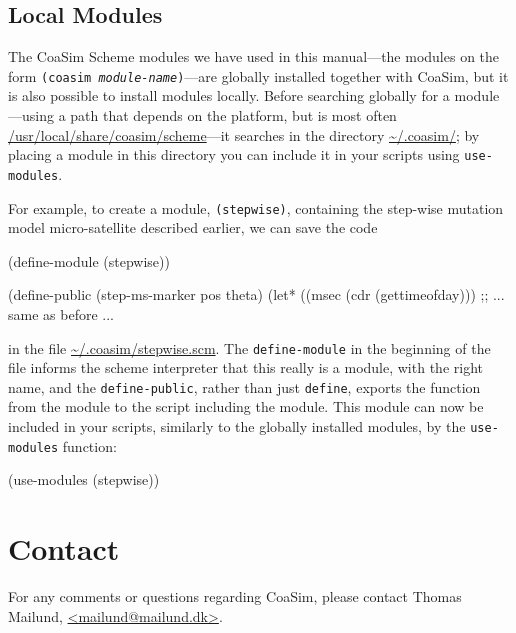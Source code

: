 \documentclass{manual}
\begin{document}
\subsection{Local Modules}
\label{sec:local-modules}

The CoaSim Scheme modules we have used in this manual---the modules on
the form \texttt{(coasim \emph{module-name})}---are globally installed
together with CoaSim, but it is also possible to install modules
locally.  Before searching globally for a module---using a path that
depends on the platform, but is most often
\url{/usr/local/share/coasim/scheme}---it searches in the directory
\url{~/.coasim/}; by placing a module in this directory you can
include it in your scripts using \texttt{use-modules}.

For example, to create a module, \texttt{(stepwise)}, containing the
step-wise mutation model micro-satellite described earlier, we can
save the code
\begin{code}
(define-module (stepwise))

(define-public (step-ms-marker pos theta)
  (let* ((msec (cdr (gettimeofday)))
  ;; ... same as before ...
\end{code}
in the file \url{~/.coasim/stepwise.scm}.  The \texttt{define-module}
in the beginning of the file informs the scheme interpreter that this
really is a module, with the right name, and the
\texttt{define-public}, rather than just \texttt{define}, exports the
function from the module to the script including the module.  This
module can now be included in your scripts, similarly to the globally
installed modules, by the \texttt{use-modules} function:
\begin{code}
(use-modules (stepwise))
\end{code}


\section{Contact}
\label{sec:contact}

For any comments or questions regarding CoaSim, please contact Thomas
Mailund, \url{<mailund@mailund.dk>}.
\end{document}
